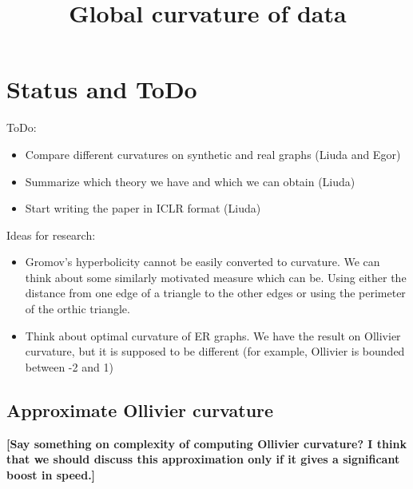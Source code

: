 \documentclass{article}
\title{Global curvature of data}
\author{}
\date{}
\begin{document}
\maketitle

\section{Status and ToDo}

ToDo:
\begin{itemize}
    \item Compare different curvatures on synthetic and real graphs (Liuda and Egor)
    \item Summarize which theory we have and which we can obtain (Liuda)
    \item Start writing the paper in ICLR format (Liuda)
\end{itemize}

Ideas for research:
\begin{itemize}
    \item Gromov's hyperbolicity cannot be easily converted to curvature. We can think about some similarly motivated measure which can be. Using either the distance from one edge of a triangle to the other edges or using the perimeter of the orthic triangle. 
    \item Think about optimal curvature of ER graphs. We have the result on  Ollivier curvature, but it is supposed to be different (for example, Ollivier is bounded between -2 and 1)
\end{itemize}

\subsection{Approximate Ollivier curvature}

\textbf{[Say something on complexity of computing Ollivier curvature? I think that we should discuss this approximation only if it gives a significant boost in speed.]}
\end{document}
